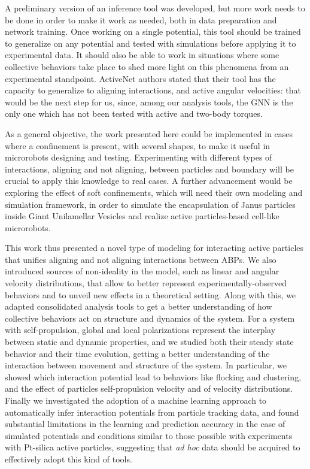 \documentclass[../../master_thesis_np.tex]{subfiles}
\begin{document}
A preliminary version of an inference tool was developed, but more work needs to be done in order to make it work as needed, both in data preparation and network training.
Once working on a single potential, this tool should be trained to generalize on any potential and tested with simulations before applying it to experimental data.
It should also be able to work in situations where some collective behaviors take place to shed more light on this phenomena from an experimental standpoint.
ActiveNet \cite{ruiz-garcia_discovering_2024} authors stated that their tool has the capacity to generalize to aligning interactions, and active angular velocities: that would be the next step for us, since, among our analysis tools, the GNN is the only one which has not been tested with active and two-body torques.

As a general objective, the work presented here could be implemented in cases where a confinement is present, with several shapes, to make it useful in microrobots designing and testing.
Experimenting with different types of interactions, aligning and not aligning, between particles and boundary will be crucial to apply this knowledge to real cases.
A further advancement would be exploring the effect of soft confinements, which will need their own modeling and simulation framework, in order to simulate the encapsulation of Janus particles inside Giant Unilamellar Vesicles and realize active particles-based cell-like microrobots.

This work thus presented a novel type of modeling for interacting active particles that unifies aligning and not aligning interactions between ABPs.
We also introduced sources of non-ideality in the model, such as linear and angular velocity distributions, that allow to better represent experimentally-observed behaviors and to unveil new effects in a theoretical setting.
Along with this, we adapted consolidated analysis tools to get a better understanding of how collective behaviors act on structure and dynamics of the system.
For a system with self-propulsion, global and local polarizations represent the interplay between static and dynamic properties, and we studied both their steady state behavior and their time evolution, getting a better understanding of the interaction between movement and structure of the system.
In particular, we showed which interaction potential lead to behaviors like flocking and clustering, and the effect of particles self-propulsion velocity and of velocity distributions.
Finally we investigated the adoption of a machine learning approach to automatically infer interaction potentials from particle tracking data, and found substantial limitations in the learning and prediction accuracy in the case of simulated potentials and conditions similar to those possible with experiments with Pt-silica active particles, suggesting that \emph{ad hoc} data should be acquired to effectively adopt this kind of tools.
\end{document}
